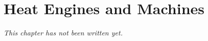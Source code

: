 \chapter{Heat Engines and Machines}\label{ch:b1:heat-engines}


\emph{This chapter has not been written yet.}
